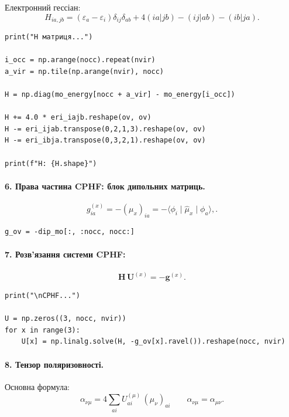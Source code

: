\documentclass{PySCFBook}
\begin{document}
Електронний гессіан:
\[
H_{ia,jb}
= (\varepsilon_a - \varepsilon_i)\delta_{ij}\delta_{ab}
+ 4(ia|jb) - (ij|ab) - (ib|ja).
\]

\begin{verbatim}
print("H матриця...")

i_occ = np.arange(nocc).repeat(nvir)
a_vir = np.tile(np.arange(nvir), nocc)

H = np.diag(mo_energy[nocc + a_vir] - mo_energy[i_occ])

H += 4.0 * eri_iajb.reshape(ov, ov)
H -= eri_ijab.transpose(0,2,1,3).reshape(ov, ov)
H -= eri_ibja.transpose(0,3,2,1).reshape(ov, ov)

print(f"H: {H.shape}")
\end{verbatim}

\paragraph{6. Права частина CPHF: блок дипольних матриць.}

\[
g^{(x)}_{ia} = - (\mu_x)_{ia} =
- \langle \phi_i \mid \hat{\mu}_x \mid \phi_a \rangle,.
\]

\begin{verbatim}
g_ov = -dip_mo[:, :nocc, nocc:]
\end{verbatim}

\paragraph{7. Розв'язання системи CPHF:}
\[
\mathbf{H}\,\mathbf{U}^{(x)} = -\mathbf{g}^{(x)}.
\]

\begin{verbatim}
print("\nCPHF...")

U = np.zeros((3, nocc, nvir))
for x in range(3):
    U[x] = np.linalg.solve(H, -g_ov[x].ravel()).reshape(nocc, nvir)
\end{verbatim}

\paragraph{8. Тензор поляризовності.}

Основна формула:
\[
\alpha_{\nu\mu}
=  4 \sum_{ai}
U^{(\mu)}_{ai}\, (\mu_\nu)_{ai}
\qquad
\alpha_{\nu\mu} = \alpha_{\mu\nu}.
\]
\end{document}
